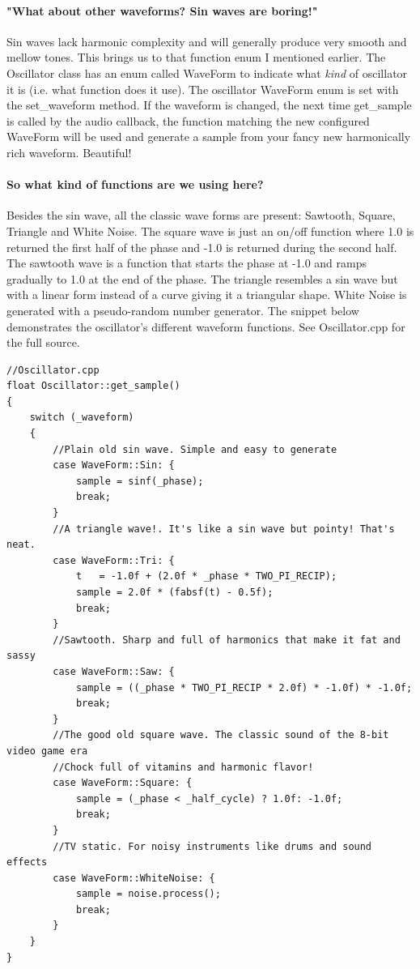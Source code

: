 \documentclass[acmlarge,screen]{acmart}
\begin{document}
	\paragraph{"What about other waveforms? Sin waves are boring!"} Sin waves lack harmonic complexity and will generally produce very smooth and mellow tones. This brings us to that function enum I mentioned earlier. The Oscillator class has an enum called WaveForm to indicate what \textit{kind} of oscillator it is (i.e. what function does it use). The oscillator WaveForm enum is set with the set\_waveform method. If the waveform is changed, the next time get\_sample is called by the audio callback, the function matching the new configured WaveForm will be used and generate a sample from your fancy new harmonically rich waveform. \cite{downey_2016} Beautiful! 
	
	\paragraph{So what kind of functions are we using here?} Besides the sin wave, all the classic wave forms are present: Sawtooth, Square, Triangle and White Noise. The square wave is just an on/off function where 1.0 is returned the first half of the phase and -1.0 is returned during the second half. The sawtooth wave is a function that starts the phase at -1.0 and ramps gradually to 1.0 at the end of the phase. The triangle resembles a sin wave but with a linear form instead of a curve giving it a triangular shape. White Noise is generated with a pseudo-random number generator. \cite{tagi_2019} The snippet below demonstrates the oscillator's different waveform functions. See Oscillator.cpp for the full source.
	
	
	\begin{verbatim}
//Oscillator.cpp
float Oscillator::get_sample()
{
	switch (_waveform)
	{
		//Plain old sin wave. Simple and easy to generate
		case WaveForm::Sin: {
			sample = sinf(_phase);
			break;
		}
		//A triangle wave!. It's like a sin wave but pointy! That's neat.
		case WaveForm::Tri: {
			t   = -1.0f + (2.0f * _phase * TWO_PI_RECIP);
			sample = 2.0f * (fabsf(t) - 0.5f);
			break;
		}
		//Sawtooth. Sharp and full of harmonics that make it fat and sassy
		case WaveForm::Saw: {
			sample = ((_phase * TWO_PI_RECIP * 2.0f) * -1.0f) * -1.0f;
			break;
		}
		//The good old square wave. The classic sound of the 8-bit video game era
		//Chock full of vitamins and harmonic flavor!
		case WaveForm::Square: {
			sample = (_phase < _half_cycle) ? 1.0f: -1.0f;
			break;
		}
		//TV static. For noisy instruments like drums and sound effects
		case WaveForm::WhiteNoise: {
			sample = noise.process();
			break;
		}
	}
}
	\end{verbatim}
\end{document}
